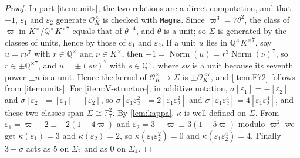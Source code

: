 \documentclass[12pt]{amsart}
\newcommand{\F}{{\mathbb F}}
\newcommand{\Q}{\mathbb{Q}}
\newcommand{\OO}{{\mathcal O}}
\DeclareMathOperator{\Norm}{Norm}
\newcommand{\Magma}{\texttt{Magma}\xspace}
\numberwithin{equation}{section}
\theoremstyle{definition}
\begin{document}
\begin{proof}
  In part \eqref{item:units}, the two relations are a direct computation, and
  that $-1$, $\varepsilon_1$ and $\varepsilon_2$ generate $\OO_K^{\times}$ is
  checked with \Magma{}. Since $\varpi^3 = 7\theta^2$,
  the class of $\varpi$ in $K^{\times}/\Q^{\times}K^{\times 7}$ equals that of
  $\theta^{-4}$, and $\theta$ is a unit; so $\Sigma$ is generated by the classes
  of units, hence by those of $\varepsilon_1$ and $\varepsilon_2$. If a unit $u$
  lies in $\Q^{\times}K^{\times 7}$, say $u = r\nu^{7}$ with $r \in \Q^{\times}$
  and $\nu \in K^{\times}$, then $\pm 1 = \Norm(u) = r^{3}\Norm(\nu)^{7}$, so
  $r \in \pm\Q^{\times 7}$, and $u = \pm(s\nu)^{7}$ with $s \in \Q^{\times}$, where
  $s\nu$ is a unit because its seventh power $\pm u$ is a unit. Hence the kernel of
  $\OO_K^{\times} \to \Sigma$ is $\pm\OO_K^{\times 7}$, and \eqref{item:F72}
  follows from \eqref{item:units}. For \eqref{item:V-structure}, in additive
  notation, $\sigma[\varepsilon_1] = -[\varepsilon_2]$ and $\sigma[\varepsilon_2]
  = [\varepsilon_1] - [\varepsilon_2]$, so
  $\sigma[\varepsilon_1\varepsilon_2^{2}] = 2[\varepsilon_1\varepsilon_2^{2}]$ and
  $\sigma[\varepsilon_1\varepsilon_2^{4}] = 4[\varepsilon_1\varepsilon_2^{4}]$, and
  these two classes span $\Sigma \cong \F_7^{2}$. By \cref{lem:kappa}, $\kappa$
  is well defined on $\Sigma$. From $\varepsilon_1 = \varpi - 2 \equiv -2(1 -
  4\varpi)$ and $\varepsilon_2 = 3 - \varpi \equiv 3(1 - 5\varpi)$ modulo
  $\varpi^{2}$ we get $\kappa(\varepsilon_1)
  = 3$ and $\kappa(\varepsilon_2) = 2$, so $\kappa(\varepsilon_1\varepsilon_2^{2})
  = 0$ and $\kappa(\varepsilon_1\varepsilon_2^{4}) = 4$. Finally $3 + \sigma$ acts
  as $5$ on $\Sigma_2$ and as $0$ on $\Sigma_4$.
\end{proof}
\end{document}
